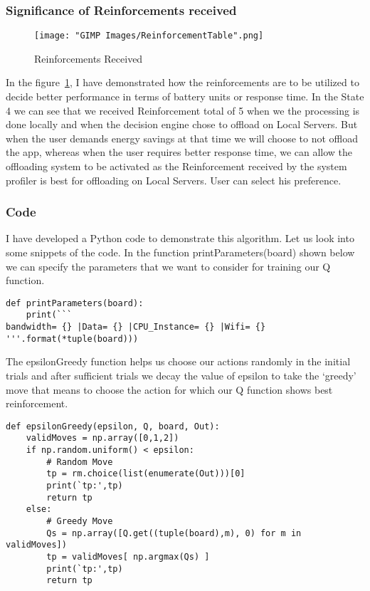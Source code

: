 \documentclass[12pt]{report}
\begin{document}
\subsubsection{Significance of Reinforcements received}
\begin{figure}[h!]
  \centering
  \texttt{[image: "GIMP Images/ReinforcementTable".png]}
  \caption{Reinforcements Received}
  \label{fig:ReinforcementTable}
\end{figure}

In the figure~\ref{fig:ReinforcementTable}, I have demonstrated how the reinforcements are to be utilized to decide better performance in terms of battery units or response time. In the State 4 we can see that we received Reinforcement total of 5 when we the processing is done locally and when the decision engine chose to offload on Local Servers. But when the user demands energy savings at that time we will choose to not offload the app, whereas when the user requires better response time, we can allow the offloading system to be activated as the Reinforcement received by the system profiler is best for offloading on Local Servers.
User can select his preference.

\subsubsection{Code}
I have developed a Python code to demonstrate this algorithm. Let us look into some snippets of the code. In the function printParameters(board) shown below we can specify the parameters that we want to consider for training our Q function.
\begin{small}
\begin{lstlisting}
def printParameters(board):
    print(```
bandwidth= {} |Data= {} |CPU_Instance= {} |Wifi= {}
'''.format(*tuple(board)))
\end{lstlisting}
\end{small}

The epsilonGreedy function helps us choose our actions randomly in the initial trials and after sufficient trials we decay the value of epsilon to take the `greedy' move that means to choose the action for which our Q function shows best reinforcement.
\begin{small}
\begin{lstlisting}
def epsilonGreedy(epsilon, Q, board, Out):
    validMoves = np.array([0,1,2])
    if np.random.uniform() < epsilon:
        # Random Move
        tp = rm.choice(list(enumerate(Out)))[0]
        print(`tp:',tp)
        return tp
    else:
        # Greedy Move
        Qs = np.array([Q.get((tuple(board),m), 0) for m in validMoves])
        tp = validMoves[ np.argmax(Qs) ] 
        print(`tp:',tp)
        return tp
\end{lstlisting}
\end{small}
\end{document}
